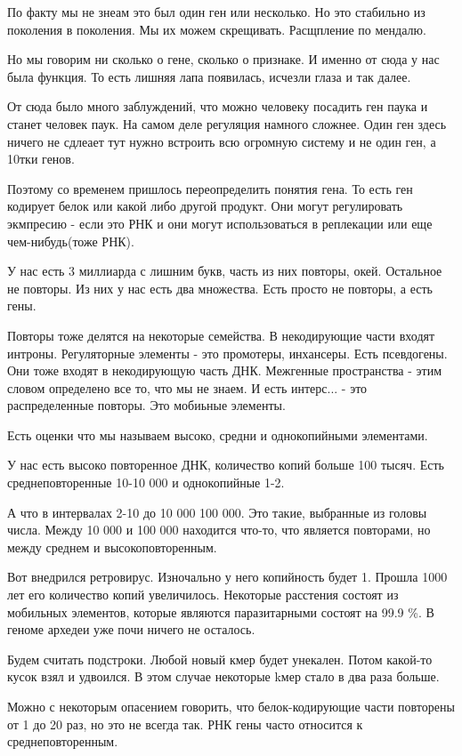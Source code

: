 По факту мы не знеам это был один ген или несколько. Но это
стабильно из поколения в поколения. Мы их можем скрещивать.
Расщпление по мендалю.

Но мы говорим ни сколько о гене, сколько о признаке. И именно от сюда у нас была функция.
То есть лишняя лапа появилась, исчезли глаза и так далее.

От сюда было много заблуждений, что можно человеку посадить ген паука и станет человек паук.
На самом деле регуляция намного сложнее. Один ген здесь ничего не сдлеает тут
нужно встроить всю огромную систему и не один ген, а 10тки генов.

Поэтому со временем пришлось переопределить понятия гена. То есть ген кодирует
белок или какой либо другой продукт. Они могут регулировать экмпресию -
если это РНК и они могут использоваться в реплекации или еще чем-нибудь(тоже РНК).

У нас есть 3 миллиарда с лишним букв, часть из них
повторы, окей. Остальное не повторы. Из них у нас
есть два множества. Есть просто не повторы, а есть гены.

Повторы тоже делятся на некоторые семейства. В некодирующие
части входят интроны. Регуляторные элементы - это
промотеры, инхансеры. Есть псевдогены. Они тоже
входят в некодирующую часть ДНК. Межгенные пространства -
этим словом определено все то, что мы не знаем. И есть
интерс... - это распределенные повторы. Это мобиьные элементы.

Есть оценки что мы называем высоко, средни и однокопийными элементами.

У нас есть высоко повторенное ДНК, количество копий больше 100 тысяч. 
Есть среднеповторенные 10-10 000 и однокопийные 1-2. 

А что в интервалах 2-10 до 10 000 100 000. Это такие, 
выбранные из головы числа. Между 10 000 и 100 000 находится что-то, 
что является повторами, но между среднем и высокоповторенным. 

Вот внедрился ретровирус. Изночально у него копийность 
будет 1. Прошла 1000 лет его количество копий увеличилось. 
Некоторые расстения состоят из мобильных элементов, которые 
являются паразитарными состоят на 99.9 \%. В геноме архедеи 
уже почи ничего не осталось. 

Будем считать подстроки. Любой новый кмер будет унекален. Потом 
какой-то кусок взял и удвоился. В этом случае некоторые kмер стало 
в два раза больше. 

Можно с некоторым опасением говорить, что белок-кодирующие 
части повторены от 1 до 20 раз, но это не всегда так. 
РНК гены часто относится к среднеповторенным. 


